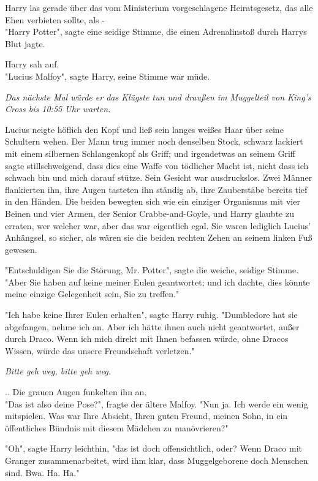 {Harry las gerade über das vom Ministerium vorgeschlagene Heiratsgesetz, das alle Ehen verbieten sollte, als -\\ "Harry Potter", sagte eine seidige Stimme, die einen Adrenalinstoß durch Harrys Blut jagte.

Harry sah auf.\\ "Lucius Malfoy", sagte Harry, seine Stimme war müde.

\emph{Das nächste Mal würde er das Klügste tun und draußen im Muggelteil von King's Cross bis 10:55 Uhr warten.}

Lucius neigte höflich den Kopf und ließ sein langes weißes Haar über seine Schultern wehen. Der Mann trug immer noch denselben Stock, schwarz lackiert mit einem silbernen Schlangenkopf als Griff; und irgendetwas an seinem Griff sagte stillschweigend, dass dies eine Waffe von tödlicher Macht ist, nicht dass ich schwach bin und mich darauf stütze. Sein Gesicht war ausdruckslos. Zwei Männer flankierten ihn, ihre Augen tasteten ihn ständig ab, ihre Zauberstäbe bereits tief in den Händen. Die beiden bewegten sich wie ein einziger Organismus mit vier Beinen und vier Armen, der Senior Crabbe-and-Goyle, und Harry glaubte zu erraten, wer welcher war, aber das war eigentlich egal. Sie waren lediglich Lucius' Anhängsel, so sicher, als wären sie die beiden rechten Zehen an seinem linken Fuß gewesen.

"Entschuldigen Sie die Störung, Mr. Potter", sagte die weiche, seidige Stimme.\\ "Aber Sie haben auf keine meiner Eulen geantwortet; und ich dachte, dies könnte meine einzige Gelegenheit sein, Sie zu treffen."

"Ich habe keine Ihrer Eulen erhalten", sagte Harry ruhig. "Dumbledore hat sie abgefangen, nehme ich an. Aber ich hätte ihnen auch nicht geantwortet, außer durch Draco. Wenn ich mich direkt mit Ihnen befassen würde, ohne Dracos Wissen, würde das unsere Freundschaft verletzen."

\emph{Bitte geh weg, bitte geh weg.}

.. Die grauen Augen funkelten ihn an.\\ "Das ist also deine Pose?", fragte der ältere Malfoy. "Nun ja. Ich werde ein wenig mitspielen. Was war Ihre Absicht, Ihren guten Freund, meinen Sohn, in ein öffentliches Bündnis mit diesem Mädchen zu manövrieren?"

"Oh", sagte Harry leichthin, "das ist doch offensichtlich, oder? Wenn Draco mit Granger zusammenarbeitet, wird ihm klar, dass Muggelgeborene doch Menschen sind. Bwa. Ha. Ha."

}
